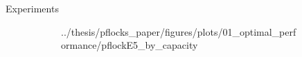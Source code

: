 \documentclass{beamer}
\begin{document}
\begin{frame}{Experiments}
\begin{figure}
\begin{subfigure}[t]{0.32\textwidth}
{                {../thesis/pflocks_paper/figures/plots/01_optimal_performance/pflockE5_by_capacity}}
            \end{subfigure}
            \hfill
            \begin{subfigure}[t]{0.32\textwidth}
            \end{subfigure}
            \begin{subfigure}[t]{0.32\textwidth}
\end{subfigure}
\end{figure}
\end{frame}
\end{document}
